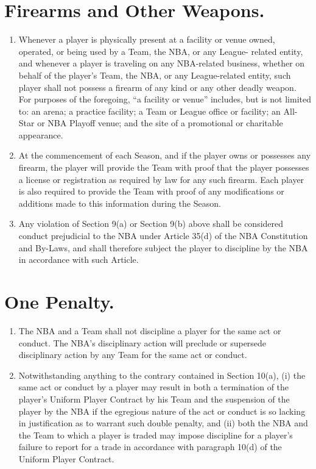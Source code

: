 \documentclass[
]{book}
\providecommand{\tightlist}{%
  \setlength{\itemsep}{0pt}\setlength{\parskip}{0pt}}
\begin{document}
\hypertarget{firearms-and-other-weapons.}{%
\section{Firearms and Other Weapons.}\label{firearms-and-other-weapons.}}

\begin{enumerate}
\def\labelenumi{(\alph{enumi})}
\tightlist
\item
  Whenever a player is physically present at a facility or venue owned, operated, or being used by a Team, the NBA, or any League- related entity, and whenever a player is traveling on any NBA-related business, whether on behalf of the player's Team, the NBA, or any League-related entity, such player shall not possess a firearm of any kind or any other deadly weapon. For purposes of the foregoing, ``a facility or venue'' includes, but is not limited to: an arena; a practice facility; a Team or League office or facility; an All-Star or NBA Playoff venue; and the site of a promotional or charitable appearance.
\item
  At the commencement of each Season, and if the player owns or possesses any firearm, the player will provide the Team with proof that the player possesses a license or registration as required by law for any such firearm. Each player is also required to provide the Team with proof of any modifications or additions made to this information during the Season.
\item
  Any violation of Section 9(a) or Section 9(b) above shall be considered conduct prejudicial to the NBA under Article 35(d) of the NBA Constitution and By-Laws, and shall therefore subject the player to discipline by the NBA in accordance with such Article.
\end{enumerate}

\hypertarget{one-penalty.}{%
\section{One Penalty.}\label{one-penalty.}}

\begin{enumerate}
\def\labelenumi{(\alph{enumi})}
\tightlist
\item
  The NBA and a Team shall not discipline a player for the same act or conduct. The NBA's disciplinary action will preclude or supersede disciplinary action by any Team for the same act or conduct.
\item
  Notwithstanding anything to the contrary contained in Section 10(a), (i) the same act or conduct by a player may result in both a termination of the player's Uniform Player Contract by his Team and the suspension of the player by the NBA if the egregious nature of the act or conduct is so lacking in justification as to warrant such double penalty, and (ii) both the NBA and the Team to which a player is traded may impose discipline for a player's failure to report for a trade in accordance with paragraph 10(d) of the Uniform Player Contract.
\end{enumerate}
\end{document}

